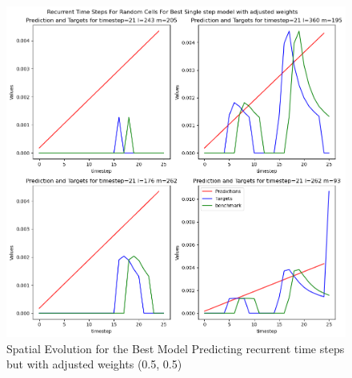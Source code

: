 \begin{figure}[tbph]
	\centering
	\includegraphics[width=0.8\linewidth, height=0.3\textheight]{Figures/Results/Final_Results/Best_SS_adjusted_weights(5,5)}
	\caption[Spatial Single Time step Predictions]{Spatial Evolution for the Best Model Predicting recurrent time steps but with adjusted weights (0.5, 0.5)}
	\label{fig:adjusted-recurrent-rc}
\end{figure}




